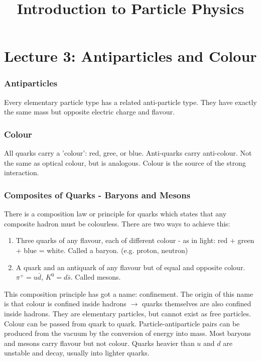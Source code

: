 \documentclass[10pt,a4paper]{article}
\title{Introduction to Particle Physics}
\begin{document}
\part*{Lecture 3: Antiparticles and Colour}

\section*{Antiparticles}

Every elementary particle type has a related anti-particle type. They have exactly the same mass but opposite electric charge and flavour.

\section*{Colour}

All quarks carry a 'colour': red, gree, or blue. Anti-quarks carry anti-colour. Not the same as optical colour, but is analogous. Colour is the source of the strong interaction.

\section*{Composites of Quarks - Baryons and Mesons}

There is a composition law or principle for quarks which states that any composite hadron must be colourless. There are two ways to achieve this:

\begin{enumerate}
\item Three quarks of any flavour, each of different colour - as in light: red + green + blue = white. Called a baryon. (e.g. proton, neutron)
\item A quark and an antiquark of any flavour but of equal and opposite colour. $\pi^+ = u\bar{d}$, $K^0 = d\bar{s}$. Called mesons.
\end{enumerate}

This composition principle has got a name: confinement. The origin of this name is that colour is confined inside hadrons $\rightarrow$ quarks themselves are also confined inside hadrons. They are elementary particles, but cannot exist as free particles. Colour can be passed from quark to quark. Particle-antiparticle pairs can be produced from the vacuum by the conversion of energy into mass. Most baryons and mesons carry flavour but not colour. Quarks heavier than $u$ and $d$ are unstable and decay, usually into lighter quarks.
\end{document}
